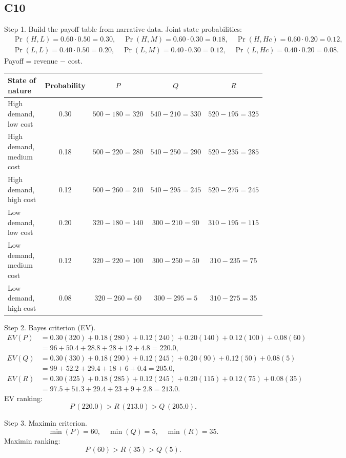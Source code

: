\begin{ExamProblems}
		\subsection*{C10}
		Step 1. Build the payoff table from narrative data.
		Joint state probabilities:
		\[
		\begin{aligned}
		&\Pr(H,L)=0.60\cdot 0.50=0.30,\quad \Pr(H,M)=0.60\cdot 0.30=0.18,\quad \Pr(H,Hc)=0.60\cdot 0.20=0.12,\\
		&\Pr(L,L)=0.40\cdot 0.50=0.20,\quad \Pr(L,M)=0.40\cdot 0.30=0.12,\quad \Pr(L,Hc)=0.40\cdot 0.20=0.08.
		\end{aligned}
		\]
		Payoff = revenue $-$ cost.
		\begin{center}
			\begin{tabular}{l c c c c}
				\toprule
				State of nature & Probability & $P$ & $Q$ & $R$ \\
				\midrule
				High demand, low cost & 0.30 & $500-180=320$ & $540-210=330$ & $520-195=325$ \\
				High demand, medium cost & 0.18 & $500-220=280$ & $540-250=290$ & $520-235=285$ \\
				High demand, high cost & 0.12 & $500-260=240$ & $540-295=245$ & $520-275=245$ \\
				Low demand, low cost & 0.20 & $320-180=140$ & $300-210=90$ & $310-195=115$ \\
				Low demand, medium cost & 0.12 & $320-220=100$ & $300-250=50$ & $310-235=75$ \\
				Low demand, high cost & 0.08 & $320-260=60$ & $300-295=5$ & $310-275=35$ \\
				\bottomrule
			\end{tabular}
		\end{center}

		Step 2. Bayes criterion (EV).
		\[
		\begin{aligned}
		EV(P)&=0.30(320)+0.18(280)+0.12(240)+0.20(140)+0.12(100)+0.08(60)\\
		&=96+50.4+28.8+28+12+4.8=220.0,\\
		EV(Q)&=0.30(330)+0.18(290)+0.12(245)+0.20(90)+0.12(50)+0.08(5)\\
		&=99+52.2+29.4+18+6+0.4=205.0,\\
		EV(R)&=0.30(325)+0.18(285)+0.12(245)+0.20(115)+0.12(75)+0.08(35)\\
		&=97.5+51.3+29.4+23+9+2.8=213.0.
		\end{aligned}
		\]
		EV ranking:
		\[
		P\,(220.0)>R\,(213.0)>Q\,(205.0).
		\]

		Step 3. Maximin criterion.
		\[
		\min(P)=60,\quad \min(Q)=5,\quad \min(R)=35.
		\]
		Maximin ranking:
		\[
		P\,(60)>R\,(35)>Q\,(5).
		\]


\end{ExamProblems}
